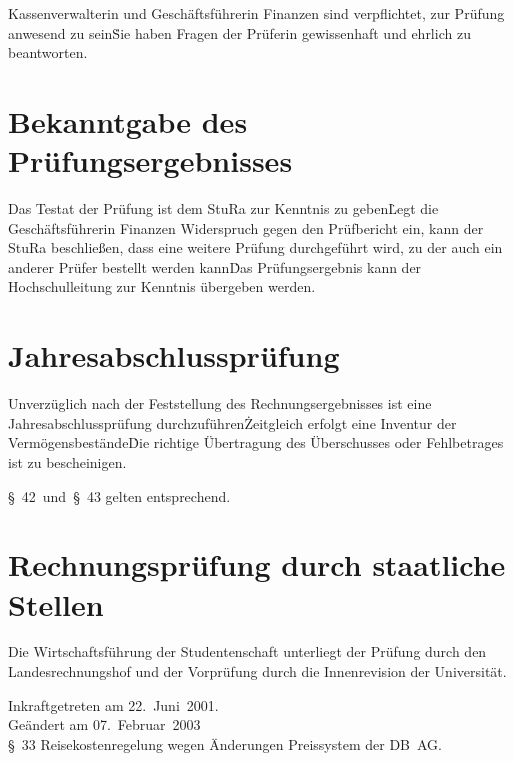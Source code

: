 {\begin{multicols}{2}
\Abs \Satz Kassenverwalterin und Geschäftsführerin Finanzen sind verpflichtet, zur Prüfung anwesend zu sein\. Sie haben Fragen der Prüferin gewissenhaft und ehrlich zu beantworten.



\section{Bekanntgabe des Prüfungsergebnisses}

\Abs \Satz Das Testat der Prüfung ist dem StuRa zur Kenntnis zu geben\. Legt die Geschäftsführerin Finanzen Widerspruch gegen den Prüfbericht ein, kann der StuRa beschließen, dass eine weitere Prüfung durchgeführt wird, zu der auch ein anderer Prüfer bestellt werden kann\. Das Prüfungsergebnis kann der Hochschulleitung zur Kenntnis übergeben werden.



\section{Jahresabschlussprüfung}

\Abs \Satz Unverzüglich nach der Feststellung des Rechnungsergebnisses ist eine Jahresabschlussprüfung durchzuführen\. Zeitgleich erfolgt eine Inventur der Vermögensbestände\. Die richtige Übertragung des Überschusses oder Fehlbetrages ist zu bescheinigen.

\Abs \Satz §~42~und~§~43 gelten entsprechend.

\section{Rechnungsprüfung durch staatliche Stellen}

\Abs \Satz Die Wirtschaftsführung der Studentenschaft unterliegt der Prüfung durch den Landesrechnungshof und der Vorprüfung durch die Innenrevision der Universität.

\end{multicols}

\nopagebreak
\vspace{1cm}
Inkraftgetreten am 22.~Juni~2001.
\\


\footnotesize
Geändert am 07.~Februar~2003\\
§~33 Reisekostenregelung wegen Änderungen Preissystem der DB~AG.

}
